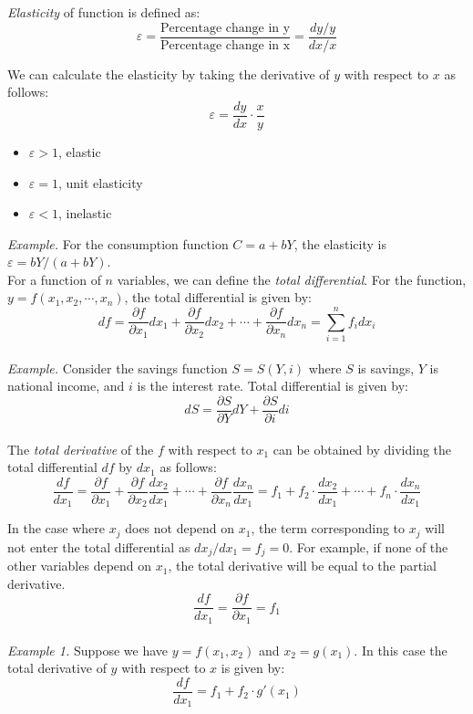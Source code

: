 \documentclass{./../Latex/handout}
\begin{document}
\textit{Elasticity} of function is defined as:
\[ \varepsilon = \frac{\text{Percentage change in y}}{\text{Percentage change in x}} = \frac{dy/y}{dx/x} \] 

We can calculate the elasticity by taking the derivative of $y$ with respect to $x$ as follows:
\[ \varepsilon = \frac{dy}{dx} \cdot \frac{x}{y} \]
\begin{itemize}
	\item $\varepsilon>1$, elastic
	\item $\varepsilon=1$, unit elasticity
	\item $\varepsilon<1$, inelastic \\
\end{itemize}

\textit{Example.} For the consumption function $ C = a + bY $, the elasticity is $\varepsilon = b Y/(a+bY)$. \\

For a function of $n$ variables, we can define the \textit{total differential}. For the function,  $y=f\left(x_{1}, x_{2}, \cdots, x_{n}\right)$, the total differential is given by:
\[
d f=\frac{\partial f}{\partial x_{1}} d x_{1}+\frac{\partial f}{\partial x_{2}} d x_{2}+\cdots+\frac{\partial f}{\partial x_{n}} d x_{n}=\sum_{i=1}^{n} f_{i} d x_{i}
\] \\


\textit{Example.} Consider the savings function $S=S(Y, i)$ where $S$ is savings, $Y$ is national income, and $i$ is the interest rate. Total differential is given by:
\[ 
d S=\frac{\partial S}{\partial Y} d Y+\frac{\partial S}{\partial i} d i
\] \\

The \textit{total derivative} of the $f$ with respect to $x_1$ can be obtained by dividing the total differential $df$ by $dx_1$ as follows:
\[
\frac{d f}{d x_1}=\frac{\partial f}{\partial x_{1}} +\frac{\partial f}{\partial x_{2}} \frac{d x_{2}}{d x_1}+\cdots+\frac{\partial f}{\partial x_{n}} \frac{d x_{n}}{d x_1} = f_1 +f_2\cdot \frac{d x_{2}}{d x_1}+\cdots+f_n \cdot\frac{d x_{n}}{d x_1} \]

In the case where $x_j$ does not depend on $x_1$, the term corresponding to $x_j$ will not enter the total differential as $d x_j/d x_1 = f_j= 0$. For example, if none of the other variables depend on $x_1$, the total derivative will be equal to the partial derivative. 
\[ \frac{d f}{d x_1} = \frac{\partial f}{\partial x_{1}} = f_1 \] \\

\textit{Example 1.} Suppose we have  $y = f(x_1, x_2)$ and $x_2 = g(x_1)$. In this case the total derivative of $y$ with respect to $x$ is given by:
\[ \frac{d f}{d x_1} = f_1+f_2 \cdot g'(x_1) \] \\
\end{document}
